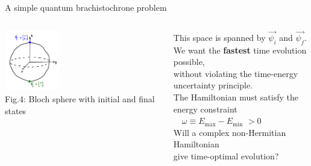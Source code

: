 \documentclass[10pt]{beamer}
\begin{document}
\begin{frame}{A simple quantum brachistochrone problem}
\begin{columns}
    \hspace{1.5em}
    \begin{column}{\textwidth}
    \includegraphics[width=0.35\textwidth]{bloch.png}\\
    \tiny{Fig.4: Bloch sphere with initial and final states}
    \end{column}
    \begin{column}{0.8\textwidth}
    \hspace{-20em}
    This space is spanned by $\vec{\psi_i}$ and $\vec{\psi_f}.$\\
    \vspace{0.4cm}
    \hspace{-20em}
    \pause
    We want the \textbf{fastest} time evolution possible,\\
    \hspace{-20em}
    without violating the time-energy uncertainty principle.\\
    \vspace{0.4cm}
    \pause
    \hspace{-20em}
    The Hamiltonian must satisfy the \textcolor{myNewColorD}{energy constraint}\\
    \hspace{-20em}
    \textcolor{myNewColorD}{$\quad\omega  \equiv E_{\mathrm{max}} - E_{\mathrm{min}}$} $> 0$\\
    \vspace{0.7cm}
    \pause
    \hspace{-18em}
    \textcolor{myNewColorC}{Will a complex non-Hermitian Hamiltonian}\\
    \hspace{-18em}
    \textcolor{myNewColorC}{give time-optimal evolution?}
    \end{column}
    \end{columns}
\end{frame}
\end{document}
